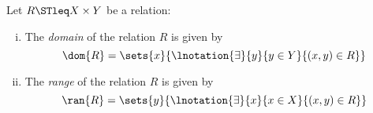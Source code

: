\begin{definition}
\label{def:domain_range}	
	Let $R \STleq X \times Y$ be a relation:
	\begin{enumerate}[(i)]
   		\item The \emph{domain} of the relation $R$ is given by
			\begin{equation*}
				\dom{R} = \sets{x}{\lnotation{\exists}{y}{y \in Y}{(x,y) \in R}}
			\end{equation*}
		\item The \emph{range} of the relation $R$ is given by
			\begin{equation*}
				\ran{R} = \sets{y}{\lnotation{\exists}{x}{x \in X}{(x,y) \in R}}
			\end{equation*}
	\end{enumerate}
\end{definition}